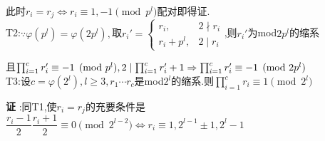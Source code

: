 此时$ r_i=r_j\Leftrightarrow r_i\equiv 1,-1\pmod{p^l}$配对即得证.
\\

T2:$ \because \varphi(p^l)=\varphi(2p^l),$取$ r_i'= \begin{cases}r_i,& 2 \nmid r_i\\ r_i+p^l,& 2\mid r_i\end{cases} $,则$ r_i'$为mod$ 2p^l$的缩系

且$ \prod_{i=1}^{c}{r_i'}\equiv -1 \pmod{p^l},2 \mid  \prod_{i=1}^{c}{r_i'}+1\Rightarrow  \prod_{i=1}^{c}{r_i'}\equiv -1 \pmod{2p^l}\\$
\\

T3:设$ c=\varphi(2^l),l\ge 3,r_1\cdots r_c$是mod$ 2^l$的缩系.则$  \prod_{i=1}^{c}{r_i}\equiv 1 \pmod{2^l}$

{\bf 证 }:同T1,使$ r_i=r_j$的充要条件是$ \dfrac{r_i-1}{2}\dfrac{r_i+1}{2}\equiv 0 \pmod{2^{l-2}}\Leftrightarrow r_i\equiv 1,2^{l-1}\pm 1,2^l-1$
